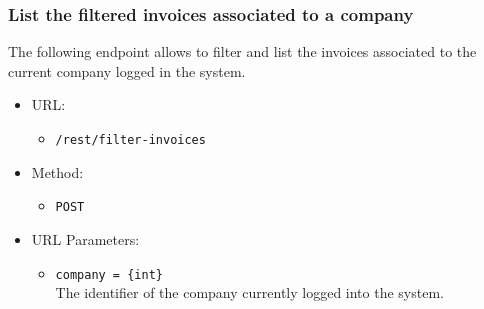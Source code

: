 \subsubsection*{List the filtered invoices associated to a company}

The following endpoint allows to filter and list the invoices associated to the current company logged in the system.

\begin{itemize}
    
    \item URL: 
    \begin{itemize}
        \item \texttt{/rest/filter-invoices}
    \end{itemize}
    
    \item Method: 
    \begin{itemize}
        \item \texttt{POST}
    \end{itemize}
    
    \item URL Parameters: 
    \begin{itemize}
        \item \texttt{company = \{int\}} \\
        The identifier of the company currently logged into the system.
    \end{itemize}


\end{itemize}
